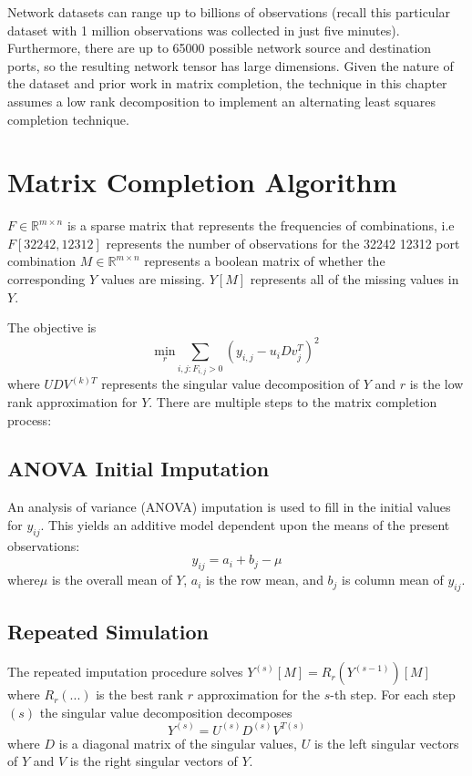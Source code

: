 \documentclass[12pt,twoside]{dukestatscithesis}
\theoremstyle{definition}
\theoremstyle{definition}
\theoremstyle{definition}
\theoremstyle{remark}
\begin{document}
Network datasets can range up to billions of observations (recall this
particular dataset with 1 million observations was collected in just
five minutes). Furthermore, there are up to 65000 possible network
source and destination ports, so the resulting network tensor has large
dimensions. Given the nature of the dataset and prior work in matrix
completion, the technique in this chapter assumes a low rank
decomposition to implement an alternating least squares completion
technique.

\section{Matrix Completion Algorithm}\label{matrix-completion-algorithm}

\(F \in \mathbb{R}^{m \times n}\) is a sparse matrix that represents the
frequencies of combinations, i.e \(F[32242,12312]\) represents the
number of observations for the 32242 12312 port combination
\(M \in \mathbb{R}^{m \times n}\) represents a boolean matrix of whether
the corresponding \(Y\) values are missing. \(Y[M]\) represents all of
the missing values in \(Y\).

The objective is
\[\underset{r}{\text{min}} \sum_{i,j:F_{i,j} > 0} (y_{i,j} - u_iDv^T_j)^2\]
where \(UDV^{(k)T}\) represents the singular value decomposition of
\(Y\) and \(r\) is the low rank approximation for \(Y\). There are
multiple steps to the matrix completion process:

\subsection{ANOVA Initial Imputation}\label{anova-initial-imputation}

An analysis of variance (ANOVA) imputation is used to fill in the
initial values for \(y_{ij}\). This yields an additive model dependent
upon the means of the present observations:
\[y_{ij} =  a_i + b_j - \mu\] where\(\mu\) is the overall mean of \(Y\),
\(a_i\) is the row mean, and \(b_j\) is column mean of \(y_{ij}\).

\subsection{Repeated Simulation}\label{repeated-simulation}

The repeated imputation procedure solves
\(Y^{(s)}[M] = R_r(Y^{(s-1)})[M]\) where \(R_r( ... )\) is the best rank
\(r\) approximation for the \(s\)-th step. For each step \((s)\) the
singular value decomposition decomposes
\[Y^{(s)} =  U^{(s)}D^{(s)}V^{T(s)}\] where \(D\) is a diagonal matrix
of the singular values, \(U\) is the left singular vectors of \(Y\) and
\(V\) is the right singular vectors of \(Y\).
\end{document}
